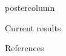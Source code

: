 \documentclass{beamer}
\begin{document}
\begin{frame}
\begin{columns}
\begin{column}{.57\textwidth}
\begin{beamercolorbox}[center]{postercolumn}
\begin{minipage}{.98\textwidth}
{%
%
\begin{myblock}{Current results}
\end{myblock}\vfill

%
%
\begin{myblock}{References}
\footnotesize


\end{myblock}\vfill


}\end{minipage}\end{beamercolorbox}
\end{column}
\end{columns}
\end{frame}
\end{document}
